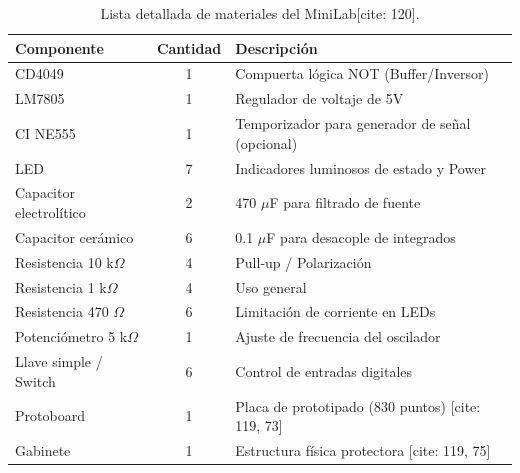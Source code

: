 \documentclass[12pt,a4paper]{article}
\begin{document}
\begin{table}[H]
	\centering
	\begin{tabular}{|l|c|l|}
		\hline
		\textbf{Componente} & \textbf{Cantidad} & \textbf{Descripción} \\ \hline
		CD4049 & 1 & Compuerta lógica NOT (Buffer/Inversor)  \\ \hline
		LM7805 & 1 & Regulador de voltaje de 5V  \\ \hline
		CI NE555 & 1 & Temporizador para generador de señal (opcional)  \\ \hline
		LED & 7 & Indicadores luminosos de estado y Power  \\ \hline
		Capacitor electrolítico & 2 & 470 $\mu$F para filtrado de fuente  \\ \hline
		Capacitor cerámico & 6 & 0.1 $\mu$F para desacople de integrados  \\ \hline
		Resistencia 10 k$\Omega$ & 4 & Pull-up / Polarización  \\ \hline
		Resistencia 1 k$\Omega$ & 4 & Uso general  \\ \hline
		Resistencia 470 $\Omega$ & 6 & Limitación de corriente en LEDs  \\ \hline
		Potenciómetro 5 k$\Omega$ & 1 & Ajuste de frecuencia del oscilador  \\ \hline
		Llave simple / Switch & 6 & Control de entradas digitales  \\ \hline
		Protoboard & 1 & Placa de prototipado (830 puntos) [cite: 119, 73] \\ \hline
		Gabinete & 1 & Estructura física protectora [cite: 119, 75] \\ \hline
	\end{tabular}
	\caption{Lista detallada de materiales del MiniLab[cite: 120].}
\end{table}




\end{document}
